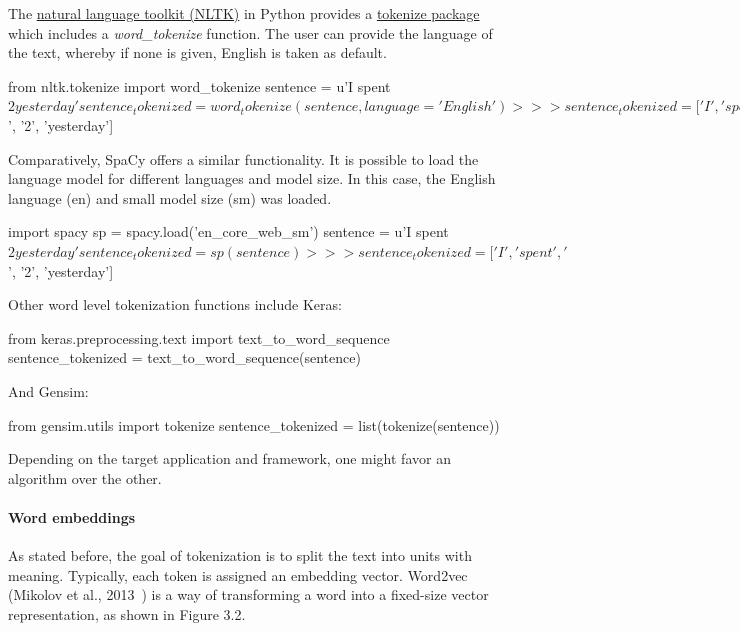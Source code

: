 The \href{https://www.nltk.org/}{natural language toolkit (NLTK)} in Python provides a \href{https://www.nltk.org/api/nltk.tokenize.html}{tokenize package} which includes a \emph{word\_tokenize} function. The user can provide the language of the text, whereby if none is given, English is taken as default.

\begin{python}
from nltk.tokenize import word_tokenize
sentence = u'I spent $2 yesterday'
sentence_tokenized = word_tokenize(sentence, language='English')
>>> sentence_tokenized = ['I', 'spent', '$', '2', 'yesterday']
\end{python}

Comparatively, SpaCy offers a similar functionality. It is possible to load the language model for different languages and model size. In this case, the English language (en) and small model size (sm) was loaded.

\begin{python}
import spacy
sp = spacy.load('en_core_web_sm')
sentence = u'I spent $2 yesterday'
sentence_tokenized = sp(sentence)
>>> sentence_tokenized = ['I', 'spent', '$', '2', 'yesterday']
\end{python}

Other word level tokenization functions include Keras:

\begin{python}
from keras.preprocessing.text import text_to_word_sequence
sentence_tokenized = text_to_word_sequence(sentence)
\end{python}

And Gensim:

\begin{python}
from gensim.utils import tokenize
sentence_tokenized = list(tokenize(sentence))
\end{python}

Depending on the target application and framework, one might favor an algorithm over the other.

\paragraph{Word embeddings}\label{subsec:wordemb}

As stated before, the goal of tokenization is to split the text into units with meaning. Typically, each token is assigned an embedding vector. Word2vec (Mikolov et al., 2013~\cite{mikolov2013efficient}) is a way of transforming a word into a fixed-size vector representation, as shown in Figure 3.2.

